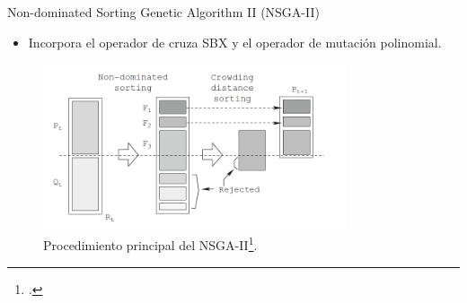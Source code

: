 \documentclass{beamer}
\begin{document}
\begin{frame}{Non-dominated Sorting Genetic Algorithm II (NSGA-II)}
\begin{itemize}
\scriptsize
\item Incorpora el operador de cruza SBX y el operador de mutación polinomial.
\end{itemize}

\begin{figure}[H]
\centering
\includegraphics[width=0.8\textwidth]{nsgaii_main.png}
\caption{\scriptsize Procedimiento principal del NSGA-II\footcite{Joel:NSGAII}.}
\end{figure}
\end{frame}
\end{document}
